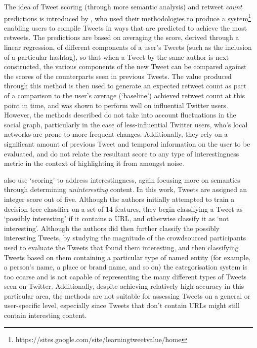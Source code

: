 The idea of Tweet scoring (through more semantic analysis) and retweet \textit{count} predictions is introduced by \citet{gransee12}, who used their methodologies to produce a system\footnote{https://sites.google.com/site/learningtweetvalue/home} enabling users to compile Tweets in ways that are predicted to achieve the most retweets. The predictions are based on averaging the score, derived through a linear regression, of different components of a user's Tweets (such as the inclusion of a particular hashtag), so that when a Tweet by the same author is next constructed, the various components of the new Tweet can be compared against the scores of the counterparts seen in previous Tweets. The value produced through this method is then used to generate an expected retweet count as part of a comparison to the user's average (`baseline') achieved retweet count at this point in time, and was shown to perform well on influential Twitter users. However, the methods described do not take into account fluctuations in the social graph, particularly in the case of less-influential Twitter users, who's local networks are prone to more frequent changes. Additionally, they rely on a significant amount of previous Tweet and temporal information on the user to be evaluated, and do not relate the resultant score to any type of interestingness metric in the context of highlighting it from amongst noise.

\citet{alonso10} also use `scoring' to address interestingness, again focusing more on semantics through determining \textit{uninteresting} content. In this work, Tweets are assigned an integer score out of five. Although the authors initially attempted to train a decision tree classifier on a set of 14 features, they begin classifying a Tweet as `possibly interesting' if it contains a URL, and otherwise classify it as `not interesting'. Although the authors did then further classify the possibly interesting Tweets, by studying the magnitude of the crowdsourced participants used to evaluate the Tweets that found them interesting, and then classifying Tweets based on them containing a particular type of named entity (for example, a person's name, a place or brand name, and so on) the categorisation system is too coarse and is not capable of representing the many different types of Tweets seen on Twitter. Additionally, despite achieving relatively high accuracy in this particular area, the methods are not suitable for assessing Tweets on a general or user-specific level, especially since Tweets that don't contain URLs might still contain interesting content.

